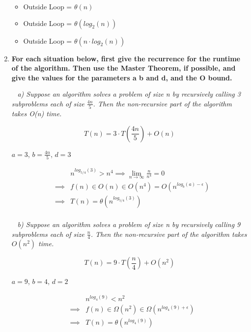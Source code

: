 \documentclass[12pt, letterpaper]{article}
\begin{document}
\begin{enumerate}
    \begin{itemize}
        \item \textnormal{Outside Loop = \(\theta(n)\)}
        \item \textnormal{Outside Loop = \(\theta(log_2(n))\)}
        \item \textnormal{Outside Loop = \(\theta(n \cdot log_2(n))\)}
    \end{itemize} 


    \newpage
    \item 
    \bf{For each situation below, first give the recurrence for the runtime of the algorithm. Then use the Master Theorem, if possible, and give the values for the parameters a b and d, and the O bound.}

    \-\ \newline
    \it{ a) Suppose an algorithm solves a problem of size n by recursively calling 3 subproblems each of size \(\frac{4n}{5}\). Then the non-recursive part of the algorithm takes O(n) time. }

    \[ T(n) = 3 \cdot T(\frac{4n}{5}) + O(n) \]

    \textnormal{ \(a = 3\), \( b = \frac{4n}{5} \), \(d = 3\) }

    \begin{eqnarray}
        && n^{log_{5/4}(3)} > n^{4} \implies \lim_{n \rightarrow \infty} \frac{n}{n^{4}} = 0 \\ 
        &\implies& f(n) \in O(n) \in O(n^4) = O(n^{log_b(a) - \epsilon }) \\
        &\implies& T(n) = \theta( n^{log_{5/4}(3)} ) \\
    \end{eqnarray}


    \-\ \newline
    \it{ b) Suppose an algorithm solves a problem of size n by recursively calling 9 subproblems each of size \(\frac{n}{4}\). Then the non-recursive part of the algorithm takes \(O(n^{2})\) time. }

    \[ T(n) = 9 \cdot T(\frac{n}{4}) + O(n^2) \]

    \textnormal{ \(a = 9\), \( b = 4 \), \(d = 2\) }

    \begin{eqnarray}
        && n^{log_4(9)} < n^{2} \\ 
        &\implies& f(n) \in \Omega(n^2) \in \Omega(n^{log_4(9) + \epsilon }) \\
        &\implies& T(n) = \theta( n^{log_4(9)} ) \\
    \end{eqnarray}


\end{enumerate}
\end{document}
